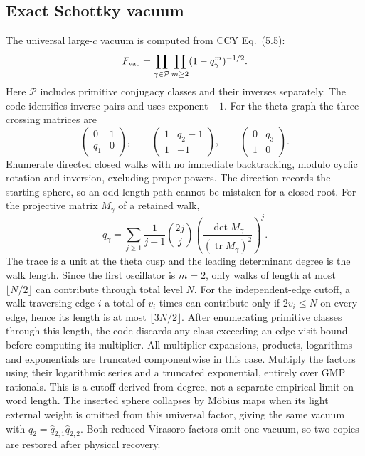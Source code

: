 \documentclass[11pt]{article}
\numberwithin{equation}{section}
\begin{document}
\subsection{Exact Schottky vacuum}
The universal large-$c$ vacuum is computed from CCY Eq.~(5.5):
\begin{equation}
 F_{\rm vac}=\prod_{\gamma\in\mathcal P}\prod_{m\ge2}
                    (1-q_\gamma^m)^{-1/2}.
 \label{eq:schottky}
\end{equation}
Here $\mathcal P$ includes primitive conjugacy classes and their inverses
separately. The code identifies inverse pairs and uses exponent $-1$.
For the theta graph the three crossing matrices are
\begin{equation}
 \begin{pmatrix}0&1\\q_1&0\end{pmatrix},\qquad
 \begin{pmatrix}1&q_2-1\\1&-1\end{pmatrix},\qquad
 \begin{pmatrix}0&q_3\\1&0\end{pmatrix}.
\end{equation}
Enumerate directed closed walks with no immediate backtracking, modulo cyclic
rotation and inversion, excluding proper powers. The direction records the
starting sphere, so an odd-length path cannot be mistaken for a closed root.
For the projective matrix $M_\gamma$ of a retained walk,
\begin{equation}
 q_\gamma=\sum_{j\ge1}\frac1{j+1}\binom{2j}{j}
     \left(\frac{\det M_\gamma}{(\operatorname{tr}M_\gamma)^2}\right)^j.
\end{equation}
The trace is a unit at the theta cusp and the leading determinant degree is
the walk length. Since the first oscillator is $m=2$, only walks of length
at most $\lfloor N/2\rfloor$ can contribute through total level $N$.
For the independent-edge cutoff, a walk traversing edge $i$ a total of
$v_i$ times can contribute only if $2v_i\le N$ on every edge, hence its
length is at most $\lfloor3N/2\rfloor$. After enumerating primitive classes
through this length, the code discards any class exceeding an edge-visit bound
before computing its multiplier. All multiplier expansions, products,
logarithms and exponentials are truncated componentwise in this case.
Multiply the factors using their logarithmic series and a truncated exponential,
entirely over GMP rationals. This is a cutoff derived from degree, not a
separate empirical limit on word length.
The inserted sphere collapses by M\"obius maps when its light external
weight is omitted from this universal factor, giving the same vacuum with
$q_2=\hat q_{2,1}\hat q_{2,2}$. Both reduced Virasoro factors omit one
vacuum, so two copies are restored after physical recovery.
\end{document}
